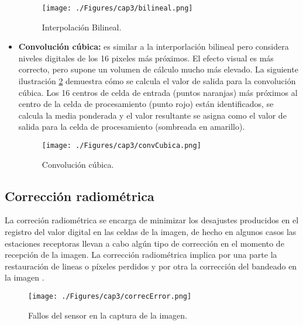 \begin{itemize}
		    \begin{figure}[H]
		    	\centering
		    	\texttt{[image: ./Figures/cap3/bilineal.png]}
		    	\caption{Interpolaci\'on Bilineal.}
		    	\label{fig:bilineal}
		    \end{figure}
		\item \textbf{Convoluci\'on c\'ubica:} es similar a la interporlaci\'on bilineal pero considera niveles digitales de los 16 pixeles m\'as pr\'oximos. El efecto visual es m\'as correcto, pero supone un volumen de c\'alculo mucho m\'as elevado. La siguiente ilustraci\'on \ref{fig:convCubica} demuestra c\'omo se calcula el valor de salida para la convoluci\'on c\'ubica. Los 16 centros de celda de entrada (puntos naranjas) m\'as pr\'oximos al centro de la celda de procesamiento (punto rojo) est\'an identificados, se calcula la media ponderada y el valor resultante se asigna como el valor de salida para la celda de procesamiento (sombreada en amarillo).
		    \begin{figure}[H]
		    	\centering
		    	\texttt{[image: ./Figures/cap3/convCubica.png]}
		    	\caption{Convoluci\'on c\'ubica.}
		    	\label{fig:convCubica}
		    \end{figure}
	\end{itemize}


\subsection{Correcci\'on radiom\'etrica}
La correci\'on radiom\'etrica se encarga de minimizar los desajustes producidos en el registro del valor digital en las celdas de la imagen, de hecho en algunos casos las estaciones receptoras llevan a cabo alg\'un tipo de correcci\'on en el momento de recepci\'on de la imagen. La corrección radiom\'etrica implica por una parte la restauraci\'on de lineas o p\'ixeles perdidos y por otra la correcci\'on del bandeado en la imagen \cite{teledUm}.
    \begin{figure}[H]
    	\centering
    	\texttt{[image: ./Figures/cap3/correcError.png]}
    	\caption{Fallos del sensor en la captura de la imagen.}
    	\label{fig:correcError}
    \end{figure}

